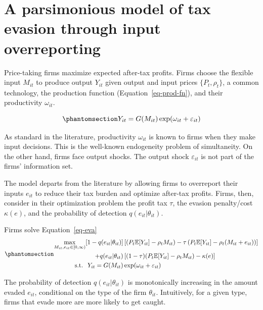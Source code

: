 \documentclass[
  12pt]{article}
\theoremstyle{definition}
\theoremstyle{remark}
\begin{document}
\section{A parsimonious model of tax evasion through input
overreporting}\label{a-parsimonious-model-of-tax-evasion-through-input-overreporting}

Price-taking firms maximize expected after-tax profits. Firms choose the
flexible input \(M_{it}\) to produce output \(Y_{it}\) given output and
input prices \(\{P_{t}, \rho_t\}\), a common technology, the production
function (Equation~\ref{eq-prod-fn}), and their productivity
\(\omega_{it}\).

\begin{equation}\phantomsection\label{eq-prod-fn}{
Y_{it}=G(M_{it})\exp(\omega_{it}+\varepsilon_{it})
}\end{equation}

As standard in the literature, productivity \(\omega_{it}\) is known to
firms when they make input decisions. This is the well-known endogeneity
problem of simultaneity. On the other hand, firms face output shocks.
The output shock \(\varepsilon_{it}\) is not part of the firms'
information set.

The model departs from the literature by allowing firms to overreport
their inputs \(e_{it}\) to reduce their tax burden and optimize
after-tax profits. Firms, then, consider in their optimization problem
the profit tax \(\tau\), the evasion penalty/cost \(\kappa(e)\), and the
probability of detection \(q(e_{it}|\theta_{it})\).

Firms solve Equation~\ref{eq-eva}
\begin{equation}\phantomsection\label{eq-eva}{
\begin{aligned}
  \max_{M_{it}, e_{it}\in [0,\infty)} [1-q(e_{it}|\theta_{it})]&\left[(P_t\mathbb{E}[Y_{it}]-\rho_{t} M_{it})-\tau\left(P_t\mathbb{E}[Y_{it}]-\rho_{t} (M_{it}+e_{it})\right)\right]\\
  +q(e_{it}|\theta_{it})&\left[(1-\tau)(P_t\mathbb{E}[Y_{it}]-\rho_{t} M_{it})-\kappa(e)\right] \\
  \text{s.t. }\; Y_{it}=G(M_{it})&\exp(\omega_{it}+\varepsilon_{it})
\end{aligned}
}\end{equation}

The probability of detection \(q(e_{it}|\theta_{it})\) is monotonically
increasing in the amount evaded \(e_{it}\), conditional on the type of
the firm \(\theta_{it}\). Intuitively, for a given type, firms that
evade more are more likely to get caught.
\end{document}
